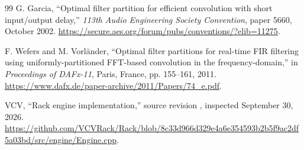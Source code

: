 \begin{thebibliography}{99}
G. Garcia, ``Optimal filter partition for efficient convolution with short
input/output delay,'' \emph{113th Audio Engineering Society Convention},
paper 5660, October 2002.
\url{https://secure.aes.org/forum/pubs/conventions/?elib=11275}.

F. Wefers and M. Vorl\"ander, ``Optimal filter partitions for real-time FIR
filtering using uniformly-partitioned FFT-based convolution in the
frequency-domain,'' in \emph{Proceedings of DAFx-11}, Paris, France,
pp. 155--161, 2011.
\url{https://www.dafx.de/paper-archive/2011/Papers/74_e.pdf}.

VCV, ``Rack engine implementation,'' source revision
, inspected September 30, 2026.
\url{https://github.com/VCVRack/Rack/blob/8c33d966d329e4a6e354593b2b5f9ac2df5a03bd/src/engine/Engine.cpp}.

\end{thebibliography}
